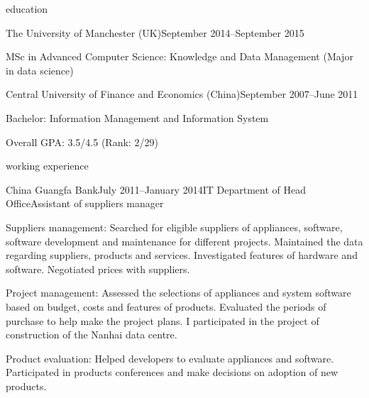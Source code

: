 \documentclass{resume} %
\begin{document}

\begin{rSection}{education}

\begin{rSubsection}{The University of Manchester (UK)}{September 2014--September 2015}{}{}
    \item MSc in Advanced Computer Science: Knowledge and Data Management (Major in data science)
\end{rSubsection}

\begin{rSubsection}{Central University of Finance and Economics (China)}{September 2007--June 2011}{}{}
    \item Bachelor: Information Management and Information System
    \item Overall GPA: 3.5/4.5 (Rank: 2/29)
\end{rSubsection}

\end{rSection}


\begin{rSection}{working experience}

\begin{rSubsection}{China Guangfa Bank}{July 2011--January 2014}{IT Department of Head Office}{Assistant of suppliers manager}
    \item Suppliers management:
    Searched for eligible suppliers of appliances, software, software development and maintenance for different projects. Maintained the data regarding suppliers, products and services.
    Investigated features of hardware and software.
    Negotiated prices with suppliers.
    \item Project management:
    Assessed the selections of appliances and system software based on budget, costs and features of products. Evaluated the periods of purchase to help make the project plans.
    I participated in the project of construction of the Nanhai data centre.
    \item Product evaluation:
    Helped developers to evaluate appliances and software. Participated in products conferences and make decisions on adoption of new products.
\end{rSubsection}

\end{rSection}
\end{document}
